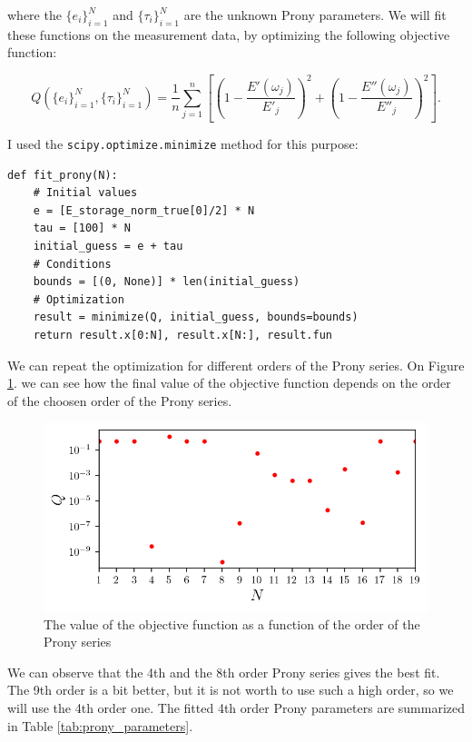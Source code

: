 \documentclass[12pt,a4paper]{article}
\begin{document}
where the $\{e_i\}_{i=1}^N$ and $\{\tau_i\}_{i=1}^N$ are the unknown Prony parameters. We will fit these functions on the measurement data, by optimizing the following objective function:

\begin{equation}
    Q\left(\{e_i\}_{i=1}^N,\{\tau_i\}_{i=1}^N\right) = 
\frac{1}{n}\sum_{j=1}^n \left[\left(1-\frac{E'(\omega_j)}{E'_j}\right)^2 + \left(1-\frac{E''(\omega_j)}{E''_j}\right)^2\right].
\end{equation}


I used the \texttt{scipy.optimize.minimize} method for this purpose:  

\lstset{style=python}
\begin{lstlisting}
def fit_prony(N):
    # Initial values
    e = [E_storage_norm_true[0]/2] * N
    tau = [100] * N
    initial_guess = e + tau
    # Conditions
    bounds = [(0, None)] * len(initial_guess)
    # Optimization
    result = minimize(Q, initial_guess, bounds=bounds)
    return result.x[0:N], result.x[N:], result.fun
\end{lstlisting}

\newpage

We can repeat the optimization for different orders of the Prony series. On Figure \ref{fig:prony_order}. we can see how the final value of the objective function depends on the order of the choosen order of the Prony series.

\begin{figure}[H]
    \centering
    \includegraphics[scale=0.9]{figures/best_prony.png}
    \caption{The value of the objective function as a function of the order of the Prony series}
    \label{fig:prony_order}
\end{figure}

We can observe that the 4th and the 8th order Prony series gives the best fit. The 9th order is a bit better, but it is not worth to use such a high order, so we will use the 4th order one. The fitted 4th order Prony parameters are summarized in  Table \ref{tab:prony_parameters}.
\end{document}
